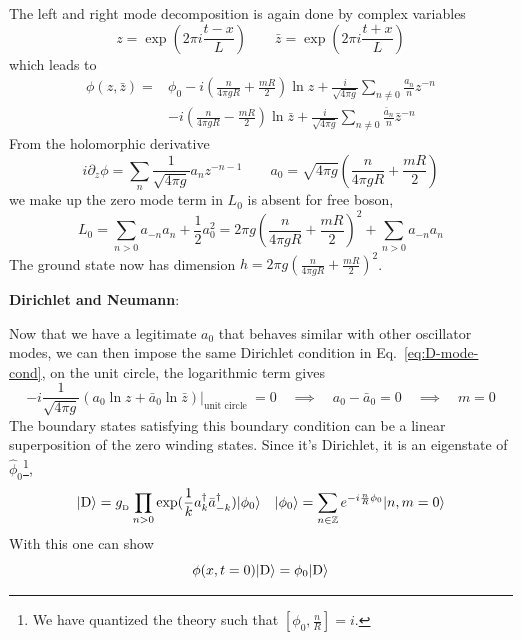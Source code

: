 \documentclass{article}
\begin{document}
The left and right mode decomposition is again done by complex variables
\begin{equation}
z = \exp( 2 \pi i \frac{t - x}{L}) \qquad \bar{z} = \exp( 2 \pi i \frac{t + x}{L})
\end{equation}
which leads to
\begin{equation}
\label{eq:boson-mode-exp}
\begin{aligned}
\phi( z, \bar{z}) = &\phi_0 -i \left( \frac{n}{4\pi g  R} + \frac{m R }{2} \right)  \ln z + \frac{i}{\sqrt{4\pi g}} \sum_{n\ne 0 } \frac{a_n}{n} z^{-n } \\
&-i \left( \frac{n}{4\pi g R} - \frac{m R }{2} \right)  \ln \bar{z} + \frac{i}{\sqrt{4\pi g}} \sum_{n\ne 0 } \frac{\bar{a}_n}{n} \bar{z}^{-n } 
\end{aligned}
\end{equation}
From the holomorphic derivative 
\begin{equation}
i \partial_z \phi =  \sum_n \frac{1}{\sqrt{4\pi g}} a_n z^{-n-1}  \qquad a_0 = \sqrt{ 4 \pi g } \left( \frac{n}{4\pi g R} + \frac{m R }{2} \right)
\end{equation}
we make up the zero mode term in $L_0$ is absent for free boson, 
\begin{equation}
L_0 = \sum_{n> 0 } a_{-n} a_n + \frac{1}{2} a_0^2 =   2\pi g \left( \frac{n}{4\pi g R} + \frac{m R }{2} \right)^2 + \sum_{n> 0 } a_{-n} a_n
\end{equation}
The ground state now has dimension $h = 2\pi g \left( \frac{n}{4\pi g R} + \frac{m R }{2} \right)^2$. 

{\bf Dirichlet and Neumann}:

Now that we have a legitimate $a_0$ that behaves similar with other oscillator modes, we can then impose the same Dirichlet condition in Eq.~\ref{eq:D-mode-cond}, on the unit circle, the logarithmic term gives 
\begin{equation}
 -i \frac{1}{\sqrt{ 4\pi g}}  ( a_0 \ln z  + \bar{a}_0 \ln \bar{z} )\Big|_{\text{unit circle }} = 0 \quad \implies \quad a_0 - \bar{a}_0 = 0  \quad \implies \quad m = 0
\end{equation}
The boundary states satisfying this boundary condition can be a linear superposition of the zero winding states. Since it's Dirichlet, it is an eigenstate of $\hat{\phi}_0$\footnote{We have quantized the theory such that $[\phi_0, \frac{n}{R}] = i $. },
\begin{equation}
|{\rm D} \rangle  = g_{\,\!_\text{D}}  \prod_{n > 0 } \exp(\frac{1}{k} a_k^{\dagger} \bar{a}_{-k}^{\dagger} )| \phi_0 \rangle \quad | \phi_0 \rangle = \sum_{n \in \mathbb{Z}} e^{-i \frac{n}{R}\phi_0 } | n, m = 0 \rangle  
\end{equation}
With this one can show
\begin{equation}
\phi( x, t = 0 ) | {\rm D} \rangle = \phi_0 | {\rm D} \rangle
\end{equation}
\end{document}

